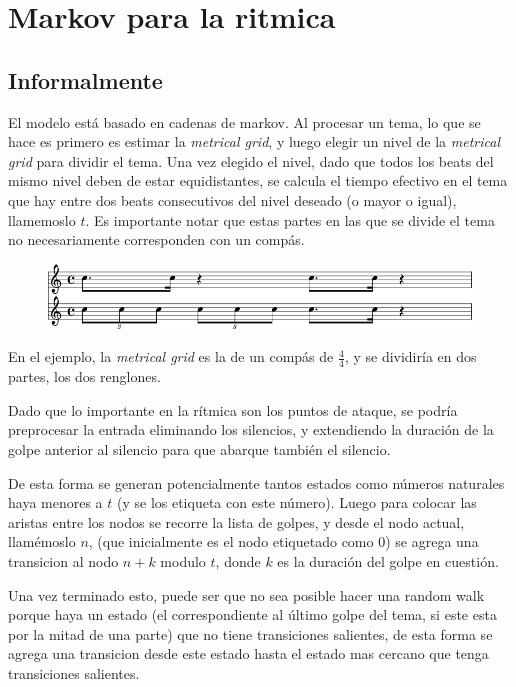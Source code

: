 


\section{Markov para la ritmica}
\subsection{Informalmente}
El modelo est\'a basado en cadenas de markov. Al procesar un tema, lo que se hace es primero es estimar la \emph{metrical 
grid}, y luego elegir un nivel de la \emph{metrical grid} para dividir el tema.
Una vez elegido el nivel, dado que todos los beats del mismo nivel deben de estar equidistantes, se calcula el 
tiempo efectivo en el tema que hay entre dos beats consecutivos del nivel deseado (o mayor o igual), llamemoslo $t$.
Es importante notar que estas partes en las que se divide el tema no necesariamente corresponden con un comp\'as.

\begin{figure}[h]
\begin{center}
\includegraphics[width=12cm]{rythm_markov/images/reggae.png}
\label{fig:reggae}
\end{center}
\end{figure}

En el ejemplo, la \emph{metrical grid} es la de un comp\'as de $\frac{4}{4}$, y se dividir\'ia en dos partes, los dos renglones.

Dado que lo importante en la r\'itmica son los puntos de ataque, se podr\'ia preprocesar la entrada eliminando los silencios, y  
extendiendo la duraci\'on de la golpe anterior al silencio para que abarque tambi\'en el silencio.

De esta forma se generan potencialmente tantos estados como n\'umeros naturales haya menores a $t$ (y se los etiqueta con este n\'umero).
Luego para colocar las aristas entre los nodos se recorre la lista de golpes, y desde el nodo actual, llam\'emoslo
$n$, (que inicialmente es el nodo etiquetado como 0) se agrega una transicion al nodo $n+k$ modulo $t$,
donde $k$ es la duraci\'on del golpe en cuesti\'on.

Una vez terminado esto, puede ser que no sea posible hacer una random walk porque haya un estado (el correspondiente al \'ultimo golpe del tema, si 
este esta por la mitad de una parte) 
que no tiene transiciones salientes, de esta forma se agrega una transicion desde este estado hasta el estado mas cercano
que tenga transiciones salientes.

